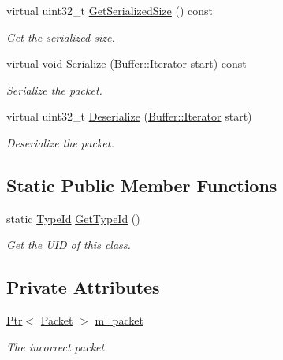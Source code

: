 \begin{DoxyCompactItemize}
virtual uint32\+\_\+t \hyperlink{classns3_1_1Icmpv6TimeExceeded_ad6895a288b441858da68b199782dcb2d}{Get\+Serialized\+Size} () const 
\begin{DoxyCompactList}\small\item\em Get the serialized size. \end{DoxyCompactList}\item 
virtual void \hyperlink{classns3_1_1Icmpv6TimeExceeded_a8cc2085dcd82138138cdc2029280a60f}{Serialize} (\hyperlink{classns3_1_1Buffer_1_1Iterator}{Buffer\+::\+Iterator} start) const 
\begin{DoxyCompactList}\small\item\em Serialize the packet. \end{DoxyCompactList}\item 
virtual uint32\+\_\+t \hyperlink{classns3_1_1Icmpv6TimeExceeded_aaa984e51f29224f2bddd776dae8154cf}{Deserialize} (\hyperlink{classns3_1_1Buffer_1_1Iterator}{Buffer\+::\+Iterator} start)
\begin{DoxyCompactList}\small\item\em Deserialize the packet. \end{DoxyCompactList}\end{DoxyCompactItemize}
\subsection*{Static Public Member Functions}
\begin{DoxyCompactItemize}
\item 
static \hyperlink{classns3_1_1TypeId}{Type\+Id} \hyperlink{classns3_1_1Icmpv6TimeExceeded_a778827a7e2d7f6e037ab25248e0616a4}{Get\+Type\+Id} ()
\begin{DoxyCompactList}\small\item\em Get the U\+ID of this class. \end{DoxyCompactList}\end{DoxyCompactItemize}
\subsection*{Private Attributes}
\begin{DoxyCompactItemize}
\item 
\hyperlink{classns3_1_1Ptr}{Ptr}$<$ \hyperlink{classns3_1_1Packet}{Packet} $>$ \hyperlink{classns3_1_1Icmpv6TimeExceeded_ab1bd4e5772991b7733caee24768e0e21}{m\+\_\+packet}
\begin{DoxyCompactList}\small\item\em The incorrect packet. \end{DoxyCompactList}\end{DoxyCompactItemize}
